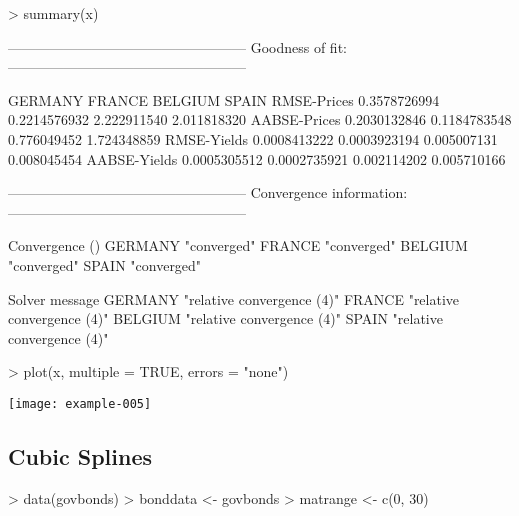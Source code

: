 \begin{Schunk}
\begin{Sinput}
> summary(x)
\end{Sinput}
\begin{Soutput}
---------------------------------------------------
Goodness of fit:
---------------------------------------------------

                  GERMANY       FRANCE     BELGIUM       SPAIN
RMSE-Prices  0.3578726994 0.2214576932 2.222911540 2.011818320
AABSE-Prices 0.2030132846 0.1184783548 0.776049452 1.724348859
RMSE-Yields  0.0008413222 0.0003923194 0.005007131 0.008045454
AABSE-Yields 0.0005305512 0.0002735921 0.002114202 0.005710166


---------------------------------------------------
Convergence information:
---------------------------------------------------

        Convergence ()
GERMANY "converged"   
FRANCE  "converged"   
BELGIUM "converged"   
SPAIN   "converged"   

        Solver message            
GERMANY "relative convergence (4)"
FRANCE  "relative convergence (4)"
BELGIUM "relative convergence (4)"
SPAIN   "relative convergence (4)"
\end{Soutput}
\end{Schunk}

\begin{center}
\begin{Schunk}
\begin{Sinput}
> plot(x, multiple = TRUE, errors = "none")
\end{Sinput}
\end{Schunk}
\texttt{[image: example-005]}
\end{center}

\subsection{Cubic Splines}

\begin{Schunk}
\begin{Sinput}
> data(govbonds)
> bonddata <- govbonds
> matrange <- c(0, 30)
\end{Sinput}
\end{Schunk}

